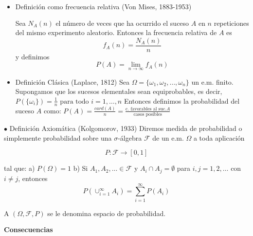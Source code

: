 \documentclass[12pt]{report}
\begin{document}
         \begin{itemize}
             \item Definición como frecuencia relativa (Von Mises, 1883-1953)

             Sea $N_{A}(n)$ el n\'umero de veces que ha ocurrido  el suceso
             $A$ en $n$ repeticiones del mismo experimento aleatorio.
             Entonces la frecuencia relativa  de $A$ es \newline
                 $$f_{A}(n)=\frac{N_{A}(n)}{n}$$
          y  definimos
             \newline
            $$P(A)=\lim_{n\to\infty} f_{A}(n)$$
             \item Definición Clásica (Laplace, 1812)
             Sea $\Omega=\{\omega_{1},\omega_{2},\ldots,\omega_{n}\}$ un e.m.
             finito. Supongamos que los sucesos elementales sean
             equi\-pro\-ba\-bles, es decir,\hfill\break
                         $P(\{\omega_{i}\})=
                     \frac{1}{n}\mbox{ para todo }
             i=1,\ldots,n$\break
    Entonces definimos la probabilidad del suceso $A$ como:\hfill\break
             $P(A)=\frac{card(A)}{n}=\frac{\mbox{c. favorables al suc.}
             A}{\mbox{casos posibles}}$
             \end{itemize}




             $\bullet$ Definición Axiomática (Kolgomorov, 1933)
             Diremos medida de probabilidad o simplemente probabilidad
             sobre una $\sigma$-álgebra $\mathcal{F}$ de un e.m. $\Omega$ a
             toda aplicación

             $$P:\mathcal{F}\to [0,1]$$

             tal que:\newline
          \noindent  a) $P(\Omega)=1$\newline
          \noindent b) Si $A_{1},A_{2},\ldots\in \mathcal{F}$ y
             $A_{i}\cap A_{j}=\emptyset$ para $i,j=1,2,
             \ldots$ con $i\not= j$,
             entonces
             $$P(\cup_{i=1}^{\infty}A_{i})=
             \sum_{i=1}^{\infty} P(A_{i})$$

             A $(\Omega,\mathcal{F},P)$ se le denomina espacio de probabilidad.





             \textbf{Consecuencias}
\end{document}
